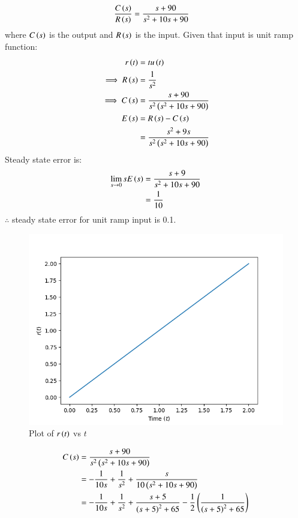 \documentclass[journal,12pt,twocolumn]{IEEEtran}
\theoremstyle{remark}
\begin{document}
\begin{align}
\frac{C\left(s\right)}{R\left(s\right)} &= \frac{s + 90}{s^2 + 10s + 90}
\end{align}
where $C\left(s\right)$ is the output and $R\left(s\right)$ is the input.
Given that input is unit ramp function:
\begin{align}
r\left(t\right) &= tu\left(t\right) \\
\implies R\left(s\right) &= \frac{1}{s^2} \\
\implies C\left(s\right) &= \frac{s + 90}{s^2\left(s^2+10s+90\right)} \\
E\left(s\right) &= R\left(s\right) - C\left(s\right) \\
&= \frac{s^2+9s}{s^2\left(s^2+10s+90\right)}
\end{align}
Steady state error is:
\begin{align}
\lim_{s\to0}{sE\left(s\right)} &= \frac{s + 9}{s^2 + 10s + 90} \\
&= \frac{1}{10}
\end{align}
$\therefore$ steady state error for unit ramp input is 0.1.
\begin{figure}[h!]
\centering
\includegraphics[width=\columnwidth]{2021/BM/46/figs/r_t.png}
\caption{Plot of $r\left(t\right)$ vs $t$}
\label{fig:2021bm46-2}
\end{figure}
\begin{align}
C\left(s\right) &= \frac{s + 90}{s^2\left(s^2+10s+90\right)} \\
&= -\frac{1}{10s} + \frac{1}{s^2} + \frac{s}{10\left(s^2 + 10s + 90\right)} \\
&= -\frac{1}{10s} + \frac{1}{s^2} + \frac{s + 5}{\left(s+5\right)^2+65} - \frac{1}{2}\left(\frac{1}{\left(s+5\right)^2+65}\right)
\end{align}
\end{document}
